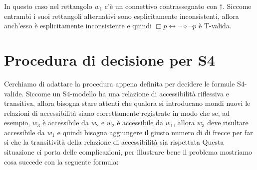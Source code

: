 \documentclass[a4paper, titlepage, 12pt]{report}
\begin{document}

In questo caso nel rettangolo $w_1$ c'è un connettivo contrassegnato con $\dagger$.
Siccome entrambi i suoi rettangoli alternativi sono esplicitamente inconsistenti,
allora anch'esso è esplicitamente inconsistente
e quindi $\Box p \leftrightarrow \neg \diamond \neg p$
è T-valida.

\section{Procedura di decisione per S4}
Cerchiamo di adattare la procedura appena definita per decidere le formule S4-valide.
Siccome un S4-modello ha una relazione di accessibilità riflessiva e transitiva, allora bisogna stare
attenti che qualora si introducano mondi nuovi le relazioni di accessibilità siano
correttamente registrate in modo che se, ad esempio, $w_3$ è accessibile da $w_2$ e $w_2$ è accessibile
da $w_1$, allora $w_3$ deve risultare accessibile da $w_1$
e quindi bisogna aggiungere il giusto
numero di di frecce per far si che la transitività della relazione di accessibilità
sia rispettata
Questa situazione ci porta delle complicazioni, per illustrare bene il problema
mostriamo cosa succede con la seguente formula:
\end{document}
